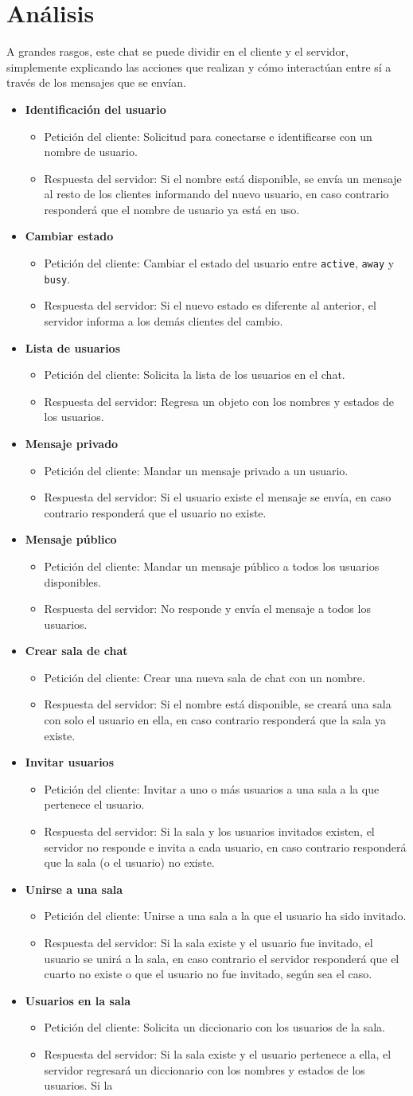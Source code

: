 \documentclass[12pt]{article}  %
\newcommand{\newItem}[3]{
  \item {\color{maincolor}\textbf{#1}}
    \begin{itemize}
      \item {\fontseries{sb}\selectfont Petición del cliente:} #2
      \item {\fontseries{sb}\selectfont Respuesta del servidor:} #3
    \end{itemize}
}
\begin{document}
\section*{Análisis}

A grandes rasgos, este chat se puede dividir en el cliente y el servidor,
simplemente explicando las acciones que realizan y cómo interactúan entre sí a
través de los mensajes que se envían.

\begin{itemize}
    \newItem{Identificación del usuario}{Solicitud para conectarse e
        identificarse con un nombre de usuario.}{Si el nombre está disponible,
        se envía un mensaje al resto de los clientes informando del nuevo
        usuario, en caso contrario responderá que el nombre de usuario ya está
        en uso.}
    \newItem{Cambiar estado}{Cambiar el estado del usuario entre \texttt{active},
        \texttt{away} y \texttt{busy}.}{Si el nuevo estado es diferente al
        anterior, el servidor informa a los demás clientes del cambio.}
    \newItem{Lista de usuarios}{Solicita la lista de los usuarios en el
        chat.}{Regresa un objeto con los nombres y estados de los usuarios.}
    \newItem{Mensaje privado}{Mandar un mensaje privado a un usuario.}{Si el
        usuario existe el mensaje se envía, en caso contrario responderá que el
        usuario no existe.}
    \newItem{Mensaje público}{Mandar un mensaje público a todos los usuarios
        disponibles.}{No responde y envía el mensaje a todos los usuarios.}
    \newItem{Crear sala de chat}{Crear una nueva sala de chat con un nombre.}{Si
        el nombre está disponible, se creará una sala con solo el usuario en
        ella, en caso contrario responderá que la sala ya existe.}
    \newItem{Invitar usuarios}{Invitar a uno o más usuarios a una sala a la que
        pertenece el usuario.}{Si la sala y los usuarios invitados existen, el
        servidor no responde e invita a cada usuario, en caso contrario
        responderá que la sala (o el usuario) no existe.}
    \newItem{Unirse a una sala}{Unirse a una sala a la que el usuario ha sido
        invitado.}{Si la sala existe y el usuario fue invitado, el usuario se
        unirá a la sala, en caso contrario el servidor responderá que el cuarto
        no existe o que el usuario no fue invitado, según sea el caso.}
    \newItem{Usuarios en la sala}{Solicita un diccionario con los usuarios de la
        sala.}{Si la sala existe y el usuario pertenece a ella, el servidor
        regresará un diccionario con los nombres y estados de los usuarios. Si la
}
\end{itemize}
\end{document}
